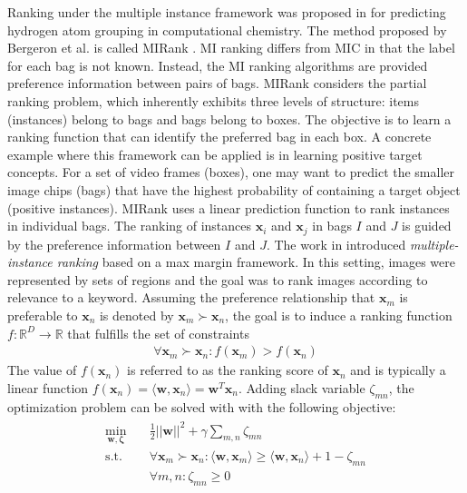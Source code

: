 Ranking under the multiple instance framework was proposed in \citep{Bergeron2008MIRanking} for predicting hydrogen atom grouping in computational chemistry. The method proposed by Bergeron et al. is called MIRank \citep{Bergeron2012FastBundleMILRanking}.  MI ranking differs from MIC in that the label for each bag is not known.  Instead, the MI ranking algorithms are provided preference information between pairs of bags. MIRank considers the partial ranking problem, which inherently exhibits three levels of structure: items (instances) belong to bags and bags belong to boxes.  The objective is to learn a ranking function that can identify the preferred bag in each box.  A concrete example where this framework can be applied is in learning positive target concepts.  For a set of video frames (boxes), one may want to predict the smaller image chips (bags) that have the highest probability of containing a target object (positive instances).  MIRank uses a linear prediction function to rank instances in individual bags.  The ranking of instances $\bm{x}_{i}$ and $\bm{x}_{j}$ in bags $I$ and $J$ is guided by the preference information between $I$ and $J$. The work in \citep{Hu2008MIRanking} introduced \textit{multiple-instance ranking} based on a max margin framework.  In this setting, images were represented by sets of regions and the goal was to rank images according to relevance to a keyword.  Assuming the preference relationship that $\bm{x}_m$ is preferable to $\bm{x}_n$ is denoted by $\bm{x}_m \succ \bm{x}_n$, the goal is to induce a ranking function $f:\mathbb{R}^{D} \to \mathbb{R}$ that fulfills the set of constraints
\begin{align}
	\forall \bm{x}_m \succ \bm{x}_n: f(\bm{x}_{m}) > f(\bm{x}_{n})
\end{align}
\noindent
The value of $f(\bm{x}_n)$ is referred to as the ranking score of $\bm{x}_n$ and is typically a linear function $f(\bm{x}_n) = \langle \bm{w},\bm{x}_{n} \rangle = \bm{w}^{T}\bm{x}_{n}$.  Adding slack variable $\zeta_{mn}$, the optimization problem can be solved with with the following objective:
\begin{align}
	\begin{split}
	\min_{\bm{w},\bm{\zeta}} \quad &\frac{1}{2} ||\bm{w} ||^{2} + \gamma \sum_{m,n} \zeta_{mn} \\
	\text{s.t.} \quad &\forall \bm{x}_m \succ \bm{x}_n: \langle \bm{w},\bm{x}_{m} \rangle \geq \langle\bm{w},\bm{x}_{n} \rangle + 1 -\zeta_{mn}\\
	&\forall m,n: \zeta_{mn} \geq 0\\
	\end{split}
\end{align}
